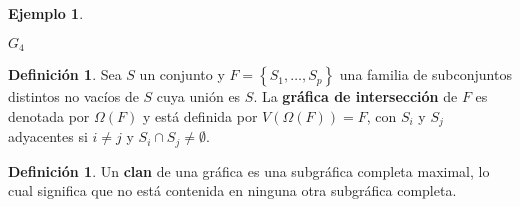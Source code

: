 \documentclass[12pt]{book}
\theoremstyle{definition}
\newtheorem{definition}[theorem]{Definición}
\newtheorem{example}[theorem]{Ejemplo}
\newcounter{in}
\newcounter{ini}
\begin{document}
\begin{example}
\begin{center}
\begin{minipage}{0.26\linewidth}
      $G_{4}$
    \end{minipage}
  \end{center}
\end{example}


\begin{definition}
  \label{intersection_graph}
  Sea $S$ un conjunto y $F = \left\{ S_{1}, \ldots, S_{p} \right\}$
  una familia de subconjuntos distintos no vacíos de $S$ cuya unión es
  $S$. La \textbf{gráfica de intersección} de $F$ es denotada por $\Omega(F)$ y
  está definida por $V(\Omega(F)) = F$, con $S_{i}$ y $S_{j}$
  adyacentes si $i \neq j$ y $S_{i} \cap S_{j} \neq \emptyset$.
\end{definition}

\begin{definition}
  \label{clique}
  Un \textbf{clan} de una gráfica es una subgráfica completa maximal,
  lo cual significa que no está contenida en ninguna otra subgráfica
  completa.
\end{definition}
\end{document}
